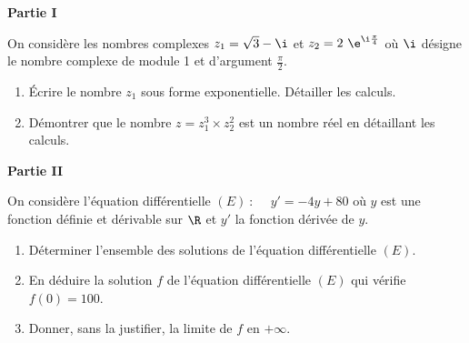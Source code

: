 \bigskip

\textbf{\large Partie I}

\medskip

On considère les nombres complexes $z_1 = \sqrt{3} - \i$ et $z_2 = 2~\e^{\i\frac{\pi}{4}}$ où $\i$ désigne le nombre
complexe de module 1 et d'argument $\frac{\pi}{2}$.
\begin{enumerate}
\item  Écrire le nombre $z_1$ sous forme exponentielle. Détailler les calculs.
\item Démontrer que le nombre $z = z_1^3\times z_2^2$ est un nombre réel en détaillant les calculs.
\end{enumerate}

\bigskip

\textbf{\large Partie II}

\medskip

On considère l'équation différentielle $(E)~ :\quad  ~y' = -4y + 80$ où $y$ est une fonction définie et dérivable sur $\R$ et $y'$ la fonction dérivée de $y$. 
\begin{enumerate}
\item  Déterminer l'ensemble des solutions de l'équation différentielle $(E)$.
\item En déduire la solution $f$ de l'équation différentielle $(E)$ qui vérifie $f(0) = 100$.
\item Donner, sans la justifier, la limite de $f$ en $+\infty$.
\end{enumerate}

\bigskip
